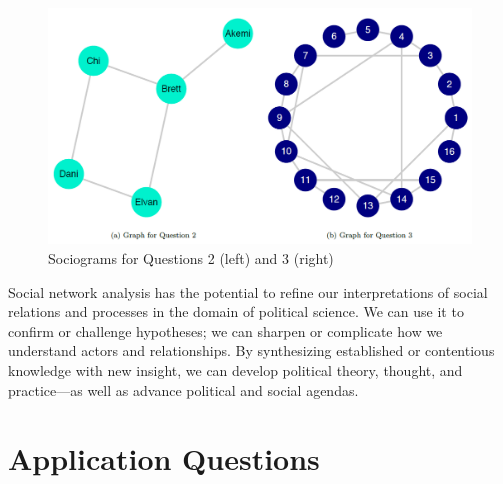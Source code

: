 \documentclass{book}
\begin{document}
\begin{figure}
\hypertarget{fig:fig11-15}{%
\centering
\includegraphics{images/social-networks/11-15.png}
\caption{Sociograms for Questions 2 (left) and 3 (right)}\label{fig:fig11-15}
}
\end{figure}

Social network analysis has the potential to refine our interpretations of
social relations and processes in the domain of political science. We can use
it to confirm or challenge hypotheses; we can sharpen or complicate how we
understand actors and relationships. By synthesizing established or
contentious knowledge with new insight, we can develop political theory,
thought, and practice---as well as advance political and social agendas.

\hypertarget{application-questions-8}{%
\section{Application Questions}\label{application-questions-8}}
\end{document}
